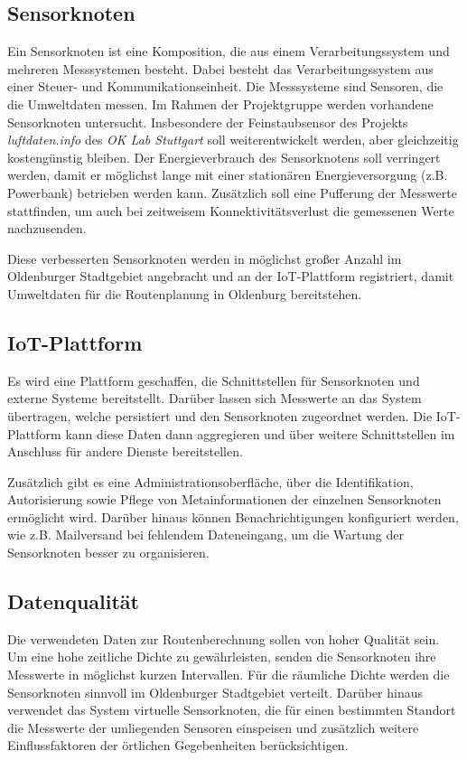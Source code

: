 \subsection{Sensorknoten}
\label{sec:SensorknotenLoesung}
Ein Sensorknoten ist eine Komposition, die aus einem Verarbeitungssystem und mehreren Messsystemen besteht. Dabei besteht das Verarbeitungssystem aus einer Steuer- und Kommunikationseinheit. Die Messsysteme sind Sensoren, die die Umweltdaten messen. Im Rahmen der Projektgruppe werden vorhandene Sensorknoten untersucht. Insbesondere der Feinstaubsensor des Projekts \textit{luftdaten.info} des \textit{OK Lab Stuttgart} \cite{luftdateninfo} soll weiterentwickelt werden, aber gleichzeitig kostengünstig bleiben. Der Energieverbrauch des Sensorknotens soll verringert werden, damit er möglichst lange mit einer stationären Energieversorgung (z.B. Powerbank) betrieben werden kann. Zusätzlich soll eine Pufferung der Messwerte stattfinden, um auch bei zeitweisem Konnektivitätsverlust die gemessenen Werte nachzusenden.

Diese verbesserten Sensorknoten werden in möglichst großer Anzahl im Oldenburger Stadtgebiet angebracht und an der IoT-Plattform registriert, damit Umweltdaten für die Routenplanung in Oldenburg bereitstehen.

\subsection{IoT-Plattform}
\label{sec:IoT-PlattformLoesung}
Es wird eine Plattform geschaffen, die Schnittstellen für Sensorknoten und externe Systeme bereitstellt. Darüber lassen sich Messwerte an das System übertragen, welche persistiert und den Sensorknoten zugeordnet werden. Die IoT-Plattform kann diese Daten dann aggregieren und über weitere Schnittstellen im Anschluss für andere Dienste bereitstellen.

Zusätzlich gibt es eine Administrationsoberfläche, über die Identifikation, Autorisierung sowie Pflege von Metainformationen der einzelnen Sensorknoten ermöglicht wird. Darüber hinaus können Benachrichtigungen konfiguriert werden, wie z.B. Mailversand bei fehlendem Dateneingang, um die Wartung der Sensorknoten besser zu organisieren.

\subsection{Datenqualität}
\label{sec:DatenqualitaetLoesung}
Die verwendeten Daten zur Routenberechnung sollen von hoher Qualität sein. Um eine hohe zeitliche Dichte zu gewährleisten, senden die Sensorknoten ihre Messwerte in möglichst kurzen Intervallen. Für die räumliche Dichte werden die Sensorknoten sinnvoll im Oldenburger Stadtgebiet verteilt. Darüber hinaus verwendet das System virtuelle Sensorknoten, die für einen bestimmten Standort die Messwerte der umliegenden Sensoren einspeisen und zusätzlich weitere Einflussfaktoren der örtlichen Gegebenheiten berücksichtigen.

